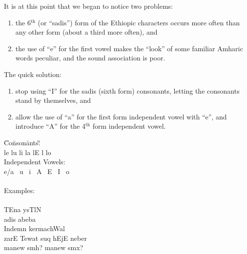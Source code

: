 \noi
It is at this point that we began to notice two problems:  
\begin{enumerate} 
      \item the 6$^{\textrm{th}}$ (or ``sadis'') form of the Ethiopic characters occurs more
            often than any other form (about a third more often), and 
 
      \item the use of ``e'' for the first vowel makes the ``look'' of some familiar
            Amharic words peculiar, and the sound association is poor.
\end{enumerate} 
\noi
 The quick solution:  
\begin{enumerate} 
      \item stop using ``I'' for the sadis (sixth form) consonants, letting the
            consonants stand by themselves, and 
 
      \item allow the use of ``a'' for the first form independent vowel with ``e'', 
            and introduce ``A'' for the 4$^{\textrm{th}}$ form independent vowel.
\end{enumerate} 
 
 
\begin{tabbing}
\hspace{0.2in}\=Co\=nson\=ants\=:\hspace{0.2in}\= \hspace{0.25in}\= \hspace{0.3in}\=  \hspace{0.25in}\= \\
      \>\>le   \>lu   \>li   \>la   \>lE   \>l    \>lo \\
 
      \>Independent Vowels: \\
      \>\>e/a  \>\ u    \>\ i    \>\ A    \>\ E    \>\ I    \>\ o \\
 
 \                                       \\
      \>Examples:                        \\
 \                                       \\
      \>  \>TEna ysTlN                   \\
      \>  \>adis abeba                   \\
      \>  \>Indemn kermachWal            \\
      \>  \>zarE Tewat suq hEjE neber    \\
      \>  \>manew smh? manew smx?          
\end{tabbing} 
 
